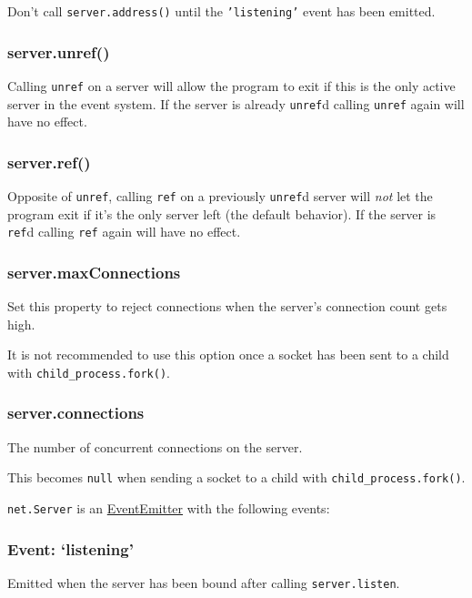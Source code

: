 Don't call \texttt{server.address()} until the \texttt{'listening'}
event has been emitted.

\subsubsection{server.unref()}

Calling \texttt{unref} on a server will allow the program to exit if
this is the only active server in the event system. If the server is
already \texttt{unref}d calling \texttt{unref} again will have no
effect.

\subsubsection{server.ref()}

Opposite of \texttt{unref}, calling \texttt{ref} on a previously
\texttt{unref}d server will \emph{not} let the program exit if it's the
only server left (the default behavior). If the server is \texttt{ref}d
calling \texttt{ref} again will have no effect.

\subsubsection{server.maxConnections}

Set this property to reject connections when the server's connection
count gets high.

It is not recommended to use this option once a socket has been sent to
a child with \texttt{child\_process.fork()}.

\subsubsection{server.connections}

The number of concurrent connections on the server.

This becomes \texttt{null} when sending a socket to a child with
\texttt{child\_process.fork()}.

\texttt{net.Server} is an
\href{events.html\#events\_class\_events\_eventemitter}{EventEmitter}
with the following events:

\subsubsection{Event: `listening'}

Emitted when the server has been bound after calling
\texttt{server.listen}.

